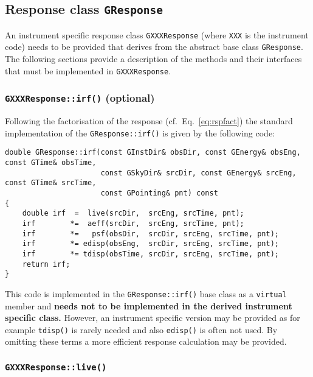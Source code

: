 \documentclass{article}[12pt,a4]
\begin{document}



\subsection{Response class {\tt GResponse}}

An instrument specific response class {\tt GXXXResponse} (where {\tt XXX} is the instrument code)
needs to be provided that derives from the abstract base class {\tt GResponse}.
The following sections provide a description of the methods and their interfaces that
must be implemented in {\tt GXXXResponse}.


\subsubsection{{\tt GXXXResponse::irf()} (optional)}

Following the factorisation of the response (cf.~Eq.~\ref{eq:rspfact}) the standard implementation
of the {\tt GResponse::irf()} is given by the following code:
\begin{verbatim}
double GResponse::irf(const GInstDir& obsDir, const GEnergy& obsEng, const GTime& obsTime,
                      const GSkyDir& srcDir, const GEnergy& srcEng, const GTime& srcTime,
                      const GPointing& pnt) const
{
    double irf  =  live(srcDir,  srcEng, srcTime, pnt);
    irf        *=  aeff(srcDir,  srcEng, srcTime, pnt);
    irf        *=   psf(obsDir,  srcDir, srcEng, srcTime, pnt);
    irf        *= edisp(obsEng,  srcDir, srcEng, srcTime, pnt);
    irf        *= tdisp(obsTime, srcDir, srcEng, srcTime, pnt);
    return irf;
}
\end{verbatim}
This code is implemented in the {\tt GResponse::irf()} base class as a {\tt virtual} member and
{\bf needs not to be implemented in the derived instrument specific class.}
However, an instrument specific version may be provided as for example {\tt tdisp()} is rarely
needed and also {\tt edisp()} is often not used.
By omitting these terms a more efficient response calculation may be provided.


\subsubsection{{\tt GXXXResponse::live()}}
\end{document}
